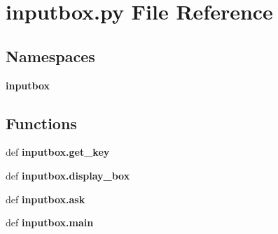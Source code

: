 \section{inputbox.\+py File Reference}
\label{inputbox_8py}
\subsection*{Namespaces}
\begin{DoxyCompactItemize}
\item 
 {\bf inputbox}
\end{DoxyCompactItemize}
\subsection*{Functions}
\begin{DoxyCompactItemize}
\item 
def {\bf inputbox.\+get\+\_\+key}
\item 
def {\bf inputbox.\+display\+\_\+box}
\item 
def {\bf inputbox.\+ask}
\item 
def {\bf inputbox.\+main}
\end{DoxyCompactItemize}
